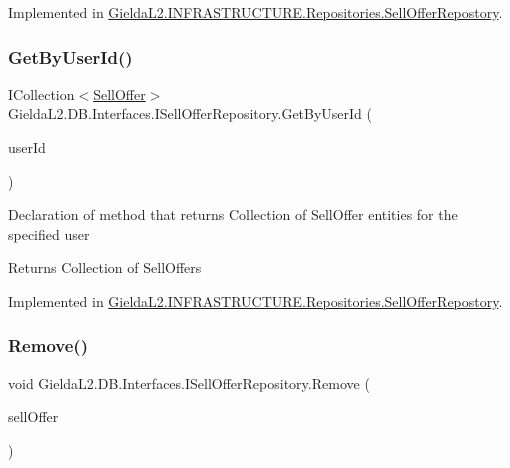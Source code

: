 Implemented in \mbox{\hyperlink{class_gielda_l2_1_1_i_n_f_r_a_s_t_r_u_c_t_u_r_e_1_1_repositories_1_1_sell_offer_repostory_a66ee116572e1e4c959b50d3ad1c4698d}{Gielda\+L2.\+I\+N\+F\+R\+A\+S\+T\+R\+U\+C\+T\+U\+R\+E.\+Repositories.\+Sell\+Offer\+Repostory}}.

\mbox{\label{interface_gielda_l2_1_1_d_b_1_1_interfaces_1_1_i_sell_offer_repository_a97f7d41b71fcbcb6c255ec3267beda01}} 
\subsubsection{\texorpdfstring{GetByUserId()}{GetByUserId()}}
{\footnotesize\ttfamily I\+Collection$<$\mbox{\hyperlink{class_gielda_l2_1_1_d_b_1_1_entities_1_1_sell_offer}{Sell\+Offer}}$>$ Gielda\+L2.\+D\+B.\+Interfaces.\+I\+Sell\+Offer\+Repository.\+Get\+By\+User\+Id (\begin{DoxyParamCaption}\item[{int}]{user\+Id }\end{DoxyParamCaption})}



Declaration of method that returns Collection of Sell\+Offer entities for the specified user 

\begin{DoxyReturn}{Returns}
Collection of Sell\+Offers
\end{DoxyReturn}


Implemented in \mbox{\hyperlink{class_gielda_l2_1_1_i_n_f_r_a_s_t_r_u_c_t_u_r_e_1_1_repositories_1_1_sell_offer_repostory_aa00ce3d22fa6d090a5e40103fb202724}{Gielda\+L2.\+I\+N\+F\+R\+A\+S\+T\+R\+U\+C\+T\+U\+R\+E.\+Repositories.\+Sell\+Offer\+Repostory}}.

\mbox{\label{interface_gielda_l2_1_1_d_b_1_1_interfaces_1_1_i_sell_offer_repository_ab77d59db7295ed7a3c7457f8cc0d84d2}} 
\subsubsection{\texorpdfstring{Remove()}{Remove()}}
{\footnotesize\ttfamily void Gielda\+L2.\+D\+B.\+Interfaces.\+I\+Sell\+Offer\+Repository.\+Remove (\begin{DoxyParamCaption}\item[{\mbox{\hyperlink{class_gielda_l2_1_1_d_b_1_1_entities_1_1_sell_offer}{Sell\+Offer}}}]{sell\+Offer }\end{DoxyParamCaption})}



